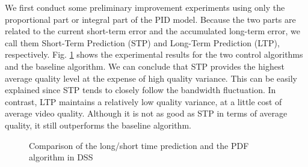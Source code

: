 \documentclass[journal]{IEEEtran}
\begin{document}
We first conduct some preliminary improvement experiments using only the proportional part or integral part of the PID model. Because the two parts are related to the current short-term error and the accumulated long-term error, we call them Short-Term Prediction (STP) and Long-Term Prediction (LTP), respectively. Fig. \ref{fig:performance-all} shows the experimental results for the two control algorithms and the baseline algorithm. We can conclude that STP provides the highest average quality level at the expense of high quality variance. This can be easily explained since STP tends to closely follow the bandwidth fluctuation. In contrast, LTP maintains a relatively low quality variance, at a little cost of average video quality. Although it is not as good as STP in terms of average quality, it still outperforms the baseline algorithm.

\begin{figure}[t]
\centering
{}
\caption{Comparison of the long/short time prediction and the PDF algorithm in DSS}
\label{fig:performance-all}
\end{figure}
\end{document}
